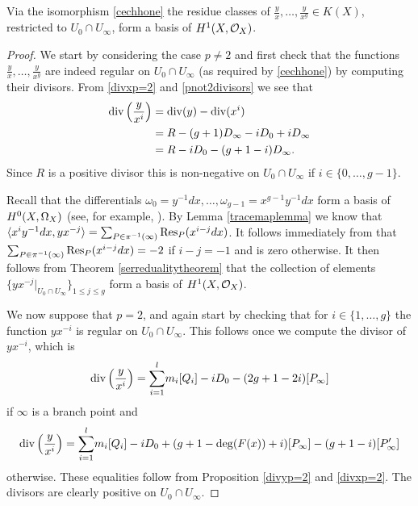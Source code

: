     \begin{prop}\label{basish1}
     Via the isomorphism \eqref{cechhone} the residue classes of $\frac{y}{x}, \ldots , \frac{y}{x^g} \in K(X)$, restricted to $U_0 \cap U_\infty$, form a basis of $H^1(X,{\cal O}_X)$.
    \end{prop}
    \begin{proof}
    We start by considering the case $p \neq 2$ and first check that the functions $\frac{y}{x}, \ldots, \frac{y}{x^g}$ are indeed regular on $U_0 \cap U_\infty$ (as required by \eqref{cechhone}) by computing their divisors.
    From \eqref{divxp=2} and \eqref{pnot2divisors} we see that
        \begin{align}\label{divisorofyoverx}
        \operatorname{div} \left( \frac{y}{x^i} \right) & = \operatorname{div} (y) - \operatorname{div} ( x^i) \nonumber \\
        & = R - (g+1)D_\infty - iD_0 + iD_\infty \nonumber \\
        & = R - iD_0 - (g+1 - i)D_\infty.
        \end{align}
    Since $R$ is a positive divisor this is non-negative on $U_0 \cap U_\infty$ if $i\in \{0, \ldots, g-1\}$.
    
    
    Recall that the differentials $\omega_0 = y^{-1}dx, \ldots, \omega_{g-1} = x^{g-1}y^{-1}dx$ form a basis of ${H^0(X,\Omega_X)}$ (see, for example, \cite[Prop. 7.4.26]{liu}).
    By Lemma \ref{tracemaplemma} we know that $\langle x^iy^{-1}dx, yx^{-j} \rangle = \sum_{P \in \pi^{-1}(\infty)}\operatorname{Res}_P(x^{i-j}dx)$.
    It follows immediately from \cite[Chap. III, Thm. 7.14.1 (b)]{hart} that $\sum_{P \in \pi^{-1}(\infty)}\operatorname{Res}_P(x^{i-j}dx) = -2$ if $i-j=-1$ and is zero otherwise.
    It then follows from Theorem \ref{serredualitytheorem} that the collection of elements $\{ yx^{-j}|_{U_0\cap U_\infty}\}_{ 1 \leq j \leq g}$ form a basis of $H^1(X,\mathcal{O}_X)$.
    
    
    
    We now suppose that $p=2$, and again start by checking that for $i \in \{1, \ldots , g\}$ the function $yx^{-i}$ is regular on $U_0 \cap U_\infty$.
    This follows once we compute the divisor of $yx^{-i}$, which is
        \begin{equation*}
        \operatorname{div} \left( \frac{y}{x^i} \right)  =  
        {\displaystyle \sum_{i=1}^l} m_i[Q_i] -iD_0 -(2g+1 - 2i)[P_\infty]
        \end{equation*}
    if $\infty$ is a branch point and
        \begin{equation*}
        \operatorname{div} \left( \frac{y}{x^i} \right)  =  
        {\displaystyle \sum_{i=1}^l} m_i[Q_i] - iD_0 +(g+1-\deg(F(x)) + i)[P_\infty] - (g+1-i)[P_\infty']
        \end{equation*}
    otherwise.
    These equalities follow from Proposition \ref{divyp=2} and \eqref{divxp=2}.
    The divisors are clearly positive on $U_0 \cap U_\infty$.
    

\end{proof}
